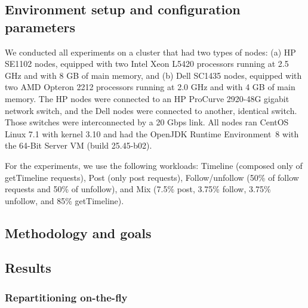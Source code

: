\subsection{Environment setup and configuration parameters}
\label{sec:evaluation:setup}

We conducted all experiments on a cluster that had two types of nodes: (a) HP SE1102 nodes, equipped with two Intel Xeon L5420 processors running at 2.5 GHz and with 8 GB of main memory, and (b) Dell SC1435 nodes, equipped with two AMD Opteron 2212 processors running at 2.0 GHz and with 4 GB of main memory. The HP nodes were connected to an HP ProCurve 2920-48G gigabit network switch, and the Dell nodes were connected to another, identical switch. Those switches were interconnected by a 20 Gbps link.
All nodes ran CentOS Linux 7.1 with kernel 3.10 and had the OpenJDK Runtime Environment~8 with the \mbox{64-Bit} Server VM (build 25.45-b02).

For the experiments, we use the following workloads:
Timeline (composed only of getTimeline requests),
Post (only post requests),
Follow/unfollow (50\% of follow requests and 50\% of unfollow), and
Mix (7.5\% post, 3.75\% follow, 3.75\% unfollow, and 85\% getTimeline).

\subsection{Methodology and goals}

\subsection{Results}

\subsubsection{Repartitioning on-the-fly}





\label{sec:evaluation:strongloc}

